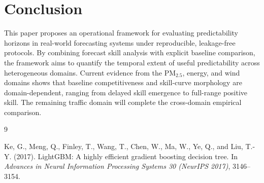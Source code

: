 \documentclass[11pt]{article}
\begin{document}
\section{Conclusion}
This paper proposes an operational framework for evaluating predictability horizons in real-world forecasting systems under reproducible, leakage-free protocols.
By combining forecast skill analysis with explicit baseline comparison, the framework aims to quantify the temporal extent of useful predictability across heterogeneous domains.
Current evidence from the PM$_{2.5}$, energy, and wind domains shows that baseline competitiveness and skill-curve morphology are domain-dependent, ranging from delayed skill emergence to full-range positive skill.
The remaining traffic domain will complete the cross-domain empirical comparison.

\begin{thebibliography}{9}

Ke, G., Meng, Q., Finley, T., Wang, T., Chen, W., Ma, W., Ye, Q., and Liu, T.-Y. (2017).
LightGBM: A highly efficient gradient boosting decision tree.
In \textit{Advances in Neural Information Processing Systems 30 (NeurIPS 2017)}, 3146--3154.

\end{thebibliography}
\end{document}
